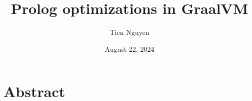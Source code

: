 \documentclass[instructions]{./Packages/uqthesis}
\title{Prolog optimizations in GraalVM}
\author{Tien Nguyen}
\date{August 22, 2024}
\begin{document}
\frontmatter
\maketitle
\clearpage

\section{Abstract}
\normalfont

\clearpage

\mainmatter










\end{document}
